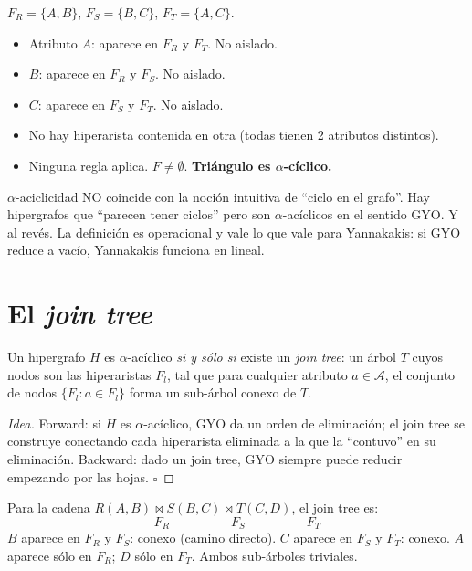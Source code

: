 \begin{ejemplo}
\(F_R = \{A, B\}\), \(F_S = \{B, C\}\), \(F_T = \{A, C\}\).

\begin{itemize}
    \item Atributo \(A\): aparece en \(F_R\) y \(F_T\). No
    aislado.
    \item \(B\): aparece en \(F_R\) y \(F_S\). No aislado.
    \item \(C\): aparece en \(F_S\) y \(F_T\). No aislado.
    \item No hay hiperarista contenida en otra (todas tienen 2
    atributos distintos).
    \item Ninguna regla aplica. \(F \neq \emptyset\). \textbf{Triángulo
    es \(\alpha\)-cíclico.}
\end{itemize}
\end{ejemplo}

\begin{nota}
\(\alpha\)-aciclicidad NO coincide con la noción intuitiva de
``ciclo en el grafo''. Hay hipergrafos que ``parecen tener ciclos''
pero son \(\alpha\)-acíclicos en el sentido GYO. Y al revés.
La definición es operacional y vale lo que vale para Yannakakis:
si GYO reduce a vacío, Yannakakis funciona en lineal.
\end{nota}

\section{El \emph{join tree}}

\begin{theorem}
Un hipergrafo \(H\) es \(\alpha\)-acíclico \emph{si y sólo si}
existe un \emph{join tree}: un árbol \(T\) cuyos nodos son las
hiperaristas \(F_l\), tal que para cualquier atributo \(a \in
\mathcal{A}\), el conjunto de nodos \(\{F_l : a \in F_l\}\) forma
un sub-árbol conexo de \(T\).
\end{theorem}

\begin{proof}[Idea]
Forward: si \(H\) es \(\alpha\)-acíclico, GYO da un orden de
eliminación; el join tree se construye conectando cada hiperarista
eliminada a la que la ``contuvo'' en su eliminación. Backward: dado
un join tree, GYO siempre puede reducir empezando por las hojas.
\(\square\)
\end{proof}

\begin{ejemplo}
Para la cadena \(R(A, B) \bowtie S(B, C) \bowtie T(C, D)\), el
join tree es:
\[
F_R \;\;-\!-\!-\;\; F_S \;\;-\!-\!-\;\; F_T
\]
\noindent
\(B\) aparece en \(F_R\) y \(F_S\): conexo (camino directo). \(C\)
aparece en \(F_S\) y \(F_T\): conexo. \(A\) aparece sólo en
\(F_R\); \(D\) sólo en \(F_T\). Ambos sub-árboles triviales.
\end{ejemplo}

